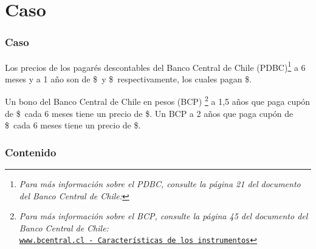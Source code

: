 \documentclass{beamer}
\begin{document}
\section{Caso}
  \begin{frame}
    
  \frametitle{Caso}

  Los precios de los pagarés descontables del Banco Central de Chile (PDBC)\footnote{\textit{Para 
  más información sobre el PDBC, consulte la página 21 del documento del Banco Central de Chile:}}
  a 6 meses y a 1 año son de \$\Fseis\ y \$\Funo\, respectivamente, los cuales pagan \$\Nominal.
  \vspace{0.5em}
  
  
  Un bono del Banco Central de Chile en pesos (BCP) \footnote{\textit{Para más información sobre el BCP, 
  consulte la página 45 del documento del Banco Central de Chile:}\\
  \tiny{\href{https://www.bcentral.cl/contenido/-/detalle/caracteristicas-de-los-instrumentos-del-mercado-financiero-nacional-3}
  {\texttt{www.bcentral.cl - Características de los instrumentos}}}}
  a 1,5 años que paga cupón de  \$\CunoCinco\  cada 6 meses tiene un precio de \$\PunoCinco. 
  Un BCP a 2 años que paga
  cupón de \$\Cdos\ cada 6 meses tiene un precio de \$\Pdos.

  \end{frame}
\begin{frame}
    \frametitle{Contenido}
    \tableofcontents
\end{frame}
\end{document}
